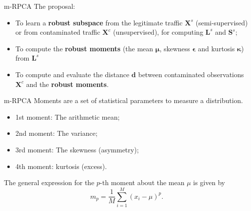 \documentclass[newPxFont, numfooter, sectionpages]{beamer}
\begin{document}
\begin{frame}[c]{m-RPCA}
    The proposal:
    \begin{itemize}
		\item To learn a \textbf{robust subspace} from the legitimate traffic $\pmb{X}^s$ (semi-supervised) or from contaminated traffic $\pmb{X}^c$ (unsupervised), for computing $\pmb{L}^s$ and $\pmb{S}^s$;
		\item To compute the \textbf{robust moments} (the mean $\pmb{\mu}$, skewness $\pmb{\epsilon}$ and kurtosis $\pmb{\kappa}$) from $\pmb{L}^s$
		\item To compute and evaluate the distance $\pmb{d}$ between contaminated observations $\pmb{X}^c$ and the \textbf{robust moments}.
	\end{itemize}
\end{frame}

\begin{frame}[c]{m-RPCA}
    Moments are a set of statistical parameters to measure a distribution.
	\begin{itemize}
		\item 1st moment: The arithmetic mean;
		\item 2nd moment: The variance;
		\item 3rd moment: The skewness (asymmetry);
		\item 4th moment: kurtosis (excess).
	\end{itemize}

    The general expression for the $p$-th moment about the mean $\mu$ is given by
    \begin{equation}\label{eq:4.09}
    	m_p = \displaystyle\frac{1}{M}\displaystyle\sum_{i = 1}^{M}(x_i - \mu)^p.
    \end{equation}
\end{frame}

%    
%    
\end{document}

